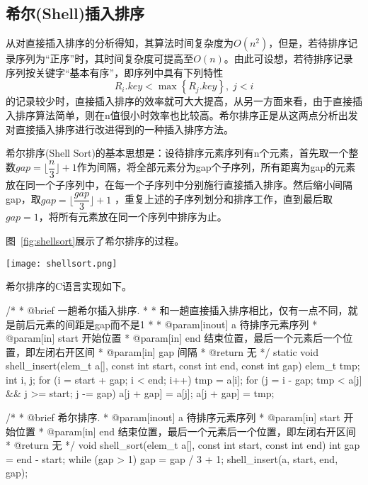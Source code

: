 \subsection{希尔(Shell)插入排序}
从对直接插入排序的分析得知，其算法时间复杂度为$O(n^2)$，但是，若待排序记录序列为“正序”时，其时间复杂度可提高至$O(n)$。由此可设想，若待排序记录序列按关键字“基本有序”，即序列中具有下列特性
$$R_i.key < \max\left\{R_j.key\right\},\; j<i$$
的记录较少时，直接插入排序的效率就可大大提高，从另一方面来看，由于直接插入排序算法简单，则在n值很小时效率也比较高。希尔排序正是从这两点分析出发对直接插入排序进行改进得到的一种插入排序方法。

希尔排序(Shell Sort)的基本思想是：设待排序元素序列有n个元素，首先取一个整数$gap=\lfloor \dfrac{n}{3} \rfloor+1$作为间隔，将全部元素分为gap个子序列，所有距离为gap的元素放在同一个子序列中，在每一个子序列中分别施行直接插入排序。然后缩小间隔gap，取$gap=\lfloor \dfrac{gap}{3}\rfloor+1$ ，重复上述的子序列划分和排序工作，直到最后取$gap=1$，将所有元素放在同一个序列中排序为止。

图~\ref{fig:shellsort}展示了希尔排序的过程。

\begin{center}
\texttt{[image: shellsort.png]}\\
\label{fig:shellsort}
\end{center}

希尔排序的C语言实现如下。
\begin{Codex}[label=shell_sort.c]
/*
  * @brief 一趟希尔插入排序.
  *
  * 和一趟直接插入排序相比，仅有一点不同，就是前后元素的间距是gap而不是1
  *
  * @param[inout] a 待排序元素序列
  * @param[in] start 开始位置
  * @param[in] end 结束位置，最后一个元素后一个位置，即左闭右开区间
  * @param[in] gap 间隔
  * @return 无
  */
static void shell_insert(elem_t a[], const int start, const int end, const int gap) {
    elem_t tmp;
    int i, j;
    for (i = start + gap; i < end; i++) {
        tmp = a[i];
        for (j = i - gap; tmp < a[j] && j >= start; j -= gap) {
            a[j + gap] = a[j];
        }
        a[j + gap] = tmp;
    }
}

 /*
  * @brief 希尔排序.
  * @param[inout] a 待排序元素序列
  * @param[in] start 开始位置
  * @param[in] end 结束位置，最后一个元素后一个位置，即左闭右开区间
  * @return 无
  */
void shell_sort(elem_t a[], const int start, const int end) {
    int gap = end - start;
    while (gap > 1) {
        gap = gap / 3 + 1;
        shell_insert(a, start, end, gap);
    }
}
\end{Codex}


